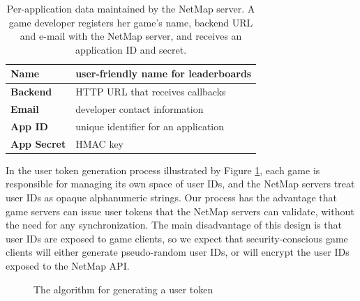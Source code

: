\begin{table}[hbtp]
\begin{tabular}{|p{2.00cm}|p{5.50cm}|}
\hline
\textbf{Name} & user-friendly name for leaderboards \\
\hline
\textbf{Backend} & HTTP URL that receives callbacks \\
\hline
\textbf{Email} & developer contact information \\
\hline
\hline
\textbf{App ID} & unique identifier for an application \\
\hline
\textbf{App Secret} & HMAC key \\
\hline
\end{tabular}
\caption{
  Per-application data maintained by the NetMap server. A game developer
  registers her game's name, backend URL and e-mail with the NetMap server, and
  receives an application ID and secret.
}
\label{table:metrics-app}
\end{table}

In the user token generation process illustrated by Figure
\ref{fig:user-token}, each game is responsible for managing its own space of
user IDs, and the NetMap servers treat user IDs as opaque alphanumeric strings.
Our process has the advantage that game servers can issue user tokens that the
NetMap servers can validate, without the need for any synchronization. The main
disadvantage of this design is that user IDs are exposed to game clients, so
we expect that security-conscious game clients will either generate
pseudo-random user IDs, or will encrypt the user IDs exposed to the NetMap API.

\begin{figure}[hbtp]
  \caption{
    The algorithm for generating a user token
  }
  \label{fig:user-token}
\end{figure}

